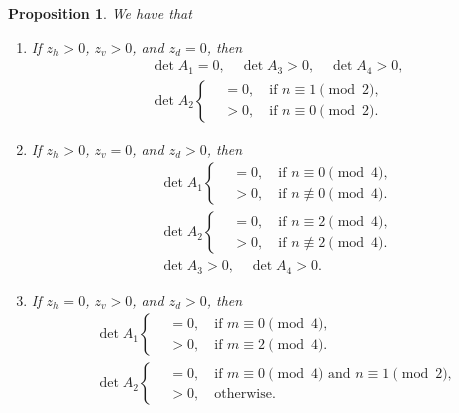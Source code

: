 \documentclass[12pt,reqno]{amsart}
\numberwithin{equation}{section}
\newtheorem{prop}[theo]{{\sc \bf Proposition}}
\begin{document}
\begin{prop} \label {detA} We have that
\begin{enumerate}
  \item If $z_h>0$, $z_v>0$, and $z_d=0$, then 
\begin{equation}\label{a9}
\begin{aligned}
&\det A_1=0,\quad  \det A_3>0, \quad \det A_4>0,\\
&\det A_2
\left\{
\begin{aligned}
&=0,\quad \textrm{if $n\equiv 1\pmod 2$},\\
&>0,\quad \textrm{if $n\equiv 0\pmod 2$}.
\end{aligned}
\right.
\end{aligned}
\end{equation}
  \item If $z_h>0$, $z_v=0$, and $z_d>0$, then 
\begin{equation}\label{a11}
\begin{aligned}
&\det A_1
\left\{
\begin{aligned}
&=0,\quad \textrm{if $n\equiv 0 \pmod 4$},\\
&>0,\quad \textrm{if $n\not\equiv 0\pmod 4$}.
\end{aligned}
\right.\\
&\det A_2
\left\{
\begin{aligned}
&=0,\quad \textrm{if $n\equiv 2 \pmod 4$},\\
&>0,\quad \textrm{if $n\not\equiv 2 \pmod 4$}.
\end{aligned}
\right.\\
&\det A_3>0, \quad \det A_4>0.
\end{aligned}
\end{equation}
  \item If $z_h=0$, $z_v>0$, and $z_d>0$, then 
\begin{equation}\label{a12}
\begin{aligned}
&\det A_1
\left\{
\begin{aligned}
&=0,\quad \textrm{if $m\equiv 0 \pmod 4$},\\
&>0,\quad \textrm{if $m\equiv 2 \pmod 4$}.
\end{aligned}
\right.\\
&\det A_2
\left\{
\begin{aligned}
&=0,\quad \textrm{if $m\equiv 0 \pmod 4$ and $n\equiv 1 \pmod 2$},\\
&>0,\quad \textrm{otherwise}.
\end{aligned}
\right.\\

\end{aligned}
\end{equation}
\end{enumerate}
\end{prop}
\end{document}
